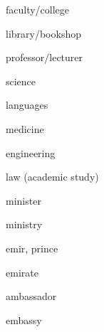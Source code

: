 \begin{flashcard}{\LARGE faculty/college}
\LARGE {}
\end{flashcard}
\begin{flashcard}{\LARGE library/bookshop}
\LARGE {}
\end{flashcard}
\begin{flashcard}{\LARGE professor/lecturer}
\LARGE {}
\end{flashcard}
\begin{flashcard}{\LARGE science}
\LARGE {}
\end{flashcard}
\begin{flashcard}{\LARGE languages}
\LARGE {}
\end{flashcard}
\begin{flashcard}{\LARGE medicine}
\LARGE {}
\end{flashcard}
\begin{flashcard}{\LARGE engineering}
\LARGE {}
\end{flashcard}
\begin{flashcard}{\LARGE law (academic study)}
\LARGE {}
\end{flashcard}
\begin{flashcard}{\LARGE minister}
\LARGE {}
\end{flashcard}
\begin{flashcard}{\LARGE ministry}
\LARGE {}
\end{flashcard}
\begin{flashcard}{\LARGE emir, prince}
\LARGE {}
\end{flashcard}
\begin{flashcard}{\LARGE emirate}
\LARGE {}
\end{flashcard}
\begin{flashcard}{\LARGE ambassador}
\LARGE {}
\end{flashcard}
\begin{flashcard}{\LARGE embassy}
\LARGE {}
\end{flashcard}
